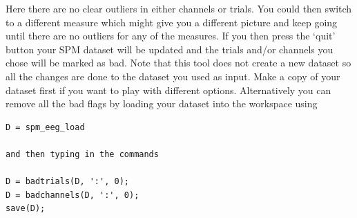 Here there are no clear outliers in either channels or trials. You could then switch to a different measure which might give you a different picture and keep going until there are no outliers for any of the measures. If you then press the `quit' button your SPM dataset will be updated and the trials and/or channels you chose will be marked as bad. Note that this tool does not create a new dataset so all the changes are done to the dataset you used as input. Make a copy of your dataset first if you want to play with different options. Alternatively you can remove all the bad flags by loading your dataset into the workspace using

\begin{verbatim}
D = spm_eeg_load

and then typing in the commands 

D = badtrials(D, ':', 0);
D = badchannels(D, ':', 0);
save(D);
\end{verbatim}
